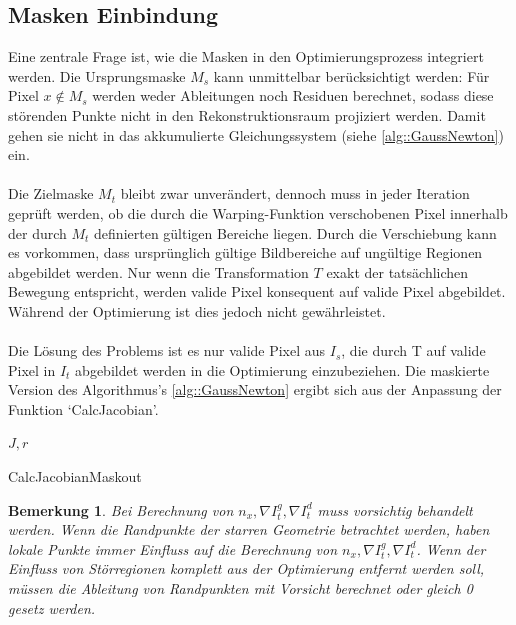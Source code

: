 \documentclass[12pt,DIV=15,BCOR=15mm,twoside,headsepline,abstract=true,listof=totoc,bibliography=totoc]{scrreprt}
\newtheorem{remark}{Bemerkung}[chapter]
\theoremstyle{remark}    %
\begin{document}
    \subsection{Masken Einbindung}
    Eine zentrale Frage ist, wie die Masken in den Optimierungsprozess integriert werden.
    Die Ursprungsmaske $M_s$ kann unmittelbar berücksichtigt werden: Für Pixel $x \notin M_s$ werden weder Ableitungen noch Residuen berechnet, sodass diese störenden Punkte 
    nicht in den Rekonstruktionsraum projiziert werden. Damit gehen sie nicht in das akkumulierte Gleichungssystem (siehe \ref{alg::GaussNewton}) ein.\\\\
    Die Zielmaske $M_t$ bleibt zwar unverändert, dennoch muss in jeder Iteration geprüft werden, ob die durch die Warping-Funktion verschobenen Pixel innerhalb der 
    durch $M_t$ definierten gültigen Bereiche liegen.
    Durch die Verschiebung kann es vorkommen, dass ursprünglich gültige Bildbereiche auf ungültige Regionen abgebildet werden.
    Nur wenn die Transformation $T$ exakt der tatsächlichen Bewegung entspricht, werden valide Pixel konsequent auf valide Pixel abgebildet. Während der Optimierung ist dies 
    jedoch nicht gewährleistet.\\\\
    Die Lösung des Problems ist es nur valide Pixel aus $I_s$, die durch T auf valide Pixel in $I_t$ abgebildet werden in die Optimierung einzubeziehen. 
    Die maskierte Version des Algorithmus's \ref{alg::GaussNewton} ergibt sich aus der Anpassung der Funktion `CalcJacobian'.
    \begin{algorithm}[h]
        
        \Return $J, r$\;
        \caption{CalcJacobianMaskout}

    \end{algorithm}
    
    \begin{remark}
    Bei Berechnung von $n_x,\nabla I_t^g, \nabla I_t^d$ muss vorsichtig behandelt werden. Wenn die Randpunkte der starren Geometrie 
    betrachtet werden, haben lokale Punkte immer Einfluss auf die Berechnung von $n_x,\nabla I_t^g, \nabla I_t^d$. Wenn der Einfluss von Störregionen
    komplett aus der Optimierung entfernt werden soll, müssen die Ableitung von Randpunkten mit Vorsicht berechnet oder gleich 0 gesetz werden.
    \end{remark}
\end{document}

